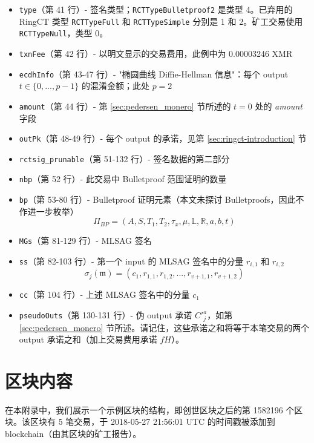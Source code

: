 \begin{appendices}
\begin{itemize}
	\item {\tt type}（第 41 行）- 签名类型；{\tt RCTTypeBulletproof2} 是类型 4。已弃用的 RingCT 类型 {\tt RCTTypeFull} 和 {\tt RCTTypeSimple} 分别是 1 和 2。矿工交易使用 {\tt RCTTypeNull}，类型 0。
	\item {\tt txnFee}（第 42 行）- 以明文显示的交易费用，此例中为 0.00003246 XMR
	\item {\tt ecdhInfo}（第 43-47 行）- "椭圆曲线 Diffie-Hellman 信息"：每个 output $t \in \{0, ..., p-1\}$ 的混淆金额；此处 $p = 2$
    \item {\tt amount}（第 44 行）- 第 \ref{sec:pedersen_monero} 节所述的 $t = 0$ 处的 {\sl amount} 字段
    \item {\tt outPk}（第 48-49 行）- 每个 output 的承诺，见第 \ref{sec:ringct-introduction} 节

    \item {\tt rctsig\_prunable}（第 51-132 行）- 签名数据的第二部分
    \item {\tt nbp}（第 52 行）- 此交易中 Bulletproof 范围证明的数量
    \item {\tt bp}（第 53-80 行）- Bulletproof 证明元素（本文未探讨 Bulletproofs，因此不作进一步枚举）\vspace{.175cm}
    \[\Pi_{BP} = (A, S, T_1, T_2, \tau_x, \mu, \mathbb{L}, \mathbb{R}, a, b, t)\]
    \item {\tt MGs}（第 81-129 行）- MLSAG 签名
    \item {\tt ss}（第 82-103 行）- 第一个 input 的 MLSAG 签名中的分量 \(r_{i,1}\) 和 \(r_{i,2}\)\vspace{.175cm}
    \[\sigma_j(\mathfrak{m}) = (c_1, r_{1, 1}, r_{1, 2}, ..., r_{v+1, 1}, r_{v+1, 2})\]
    \item {\tt cc}（第 104 行）- 上述 MLSAG 签名中的分量 \(c_1\)
    \item {\tt pseudoOuts}（第 130-131 行）- 伪 output 承诺 $C'^a_j$，如第 \ref{sec:pedersen_monero} 节所述。请记住，这些承诺之和将等于本笔交易的两个 output 承诺之和（加上交易费用承诺 $f H$）。
\end{itemize}




\chapter{区块内容}
\label{appendix:block-content}

在本附录中，我们展示一个示例区块的结构，即创世区块之后的第 1582196 个区块。该区块有 5 笔交易，于 2018-05-27 21:56:01 UTC 的时间戳被添加到 blockchain（由其区块的矿工报告）。


\end{appendices}

